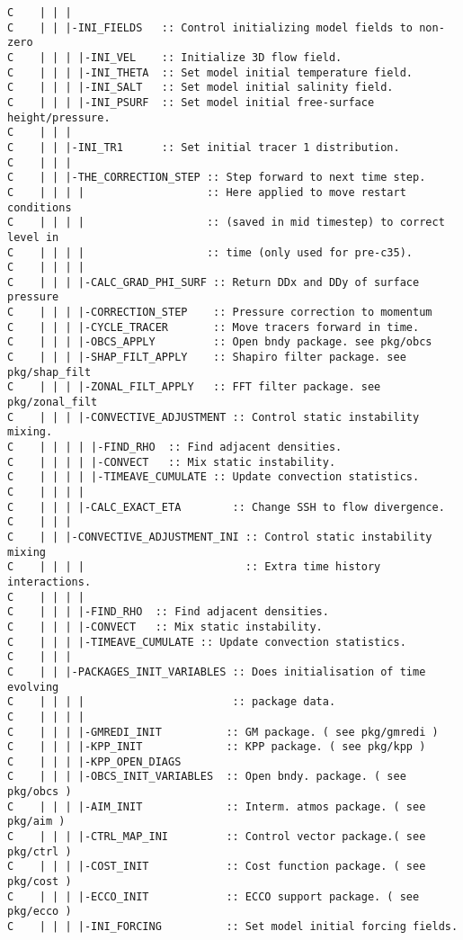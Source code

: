 {\begin{verbatim}
C    | | |
C    | | |-INI_FIELDS   :: Control initializing model fields to non-zero
C    | | | |-INI_VEL    :: Initialize 3D flow field.
C    | | | |-INI_THETA  :: Set model initial temperature field.
C    | | | |-INI_SALT   :: Set model initial salinity field.
C    | | | |-INI_PSURF  :: Set model initial free-surface height/pressure.
C    | | |
C    | | |-INI_TR1      :: Set initial tracer 1 distribution.
C    | | |
C    | | |-THE_CORRECTION_STEP :: Step forward to next time step.
C    | | | |                   :: Here applied to move restart conditions
C    | | | |                   :: (saved in mid timestep) to correct level in 
C    | | | |                   :: time (only used for pre-c35).
C    | | | |
C    | | | |-CALC_GRAD_PHI_SURF :: Return DDx and DDy of surface pressure
C    | | | |-CORRECTION_STEP    :: Pressure correction to momentum
C    | | | |-CYCLE_TRACER       :: Move tracers forward in time.
C    | | | |-OBCS_APPLY         :: Open bndy package. see pkg/obcs
C    | | | |-SHAP_FILT_APPLY    :: Shapiro filter package. see pkg/shap_filt
C    | | | |-ZONAL_FILT_APPLY   :: FFT filter package. see pkg/zonal_filt
C    | | | |-CONVECTIVE_ADJUSTMENT :: Control static instability mixing.
C    | | | | |-FIND_RHO  :: Find adjacent densities.
C    | | | | |-CONVECT   :: Mix static instability.
C    | | | | |-TIMEAVE_CUMULATE :: Update convection statistics.
C    | | | | 
C    | | | |-CALC_EXACT_ETA        :: Change SSH to flow divergence.     
C    | | | 
C    | | |-CONVECTIVE_ADJUSTMENT_INI :: Control static instability mixing
C    | | | |                         :: Extra time history interactions.
C    | | | |                       
C    | | | |-FIND_RHO  :: Find adjacent densities.
C    | | | |-CONVECT   :: Mix static instability.
C    | | | |-TIMEAVE_CUMULATE :: Update convection statistics.
C    | | |
C    | | |-PACKAGES_INIT_VARIABLES :: Does initialisation of time evolving 
C    | | | |                       :: package data.
C    | | | |
C    | | | |-GMREDI_INIT          :: GM package. ( see pkg/gmredi )
C    | | | |-KPP_INIT             :: KPP package. ( see pkg/kpp )
C    | | | |-KPP_OPEN_DIAGS    
C    | | | |-OBCS_INIT_VARIABLES  :: Open bndy. package. ( see pkg/obcs )
C    | | | |-AIM_INIT             :: Interm. atmos package. ( see pkg/aim )
C    | | | |-CTRL_MAP_INI         :: Control vector package.( see pkg/ctrl )
C    | | | |-COST_INIT            :: Cost function package. ( see pkg/cost )
C    | | | |-ECCO_INIT            :: ECCO support package. ( see pkg/ecco )
C    | | | |-INI_FORCING          :: Set model initial forcing fields.

\end{verbatim}}

